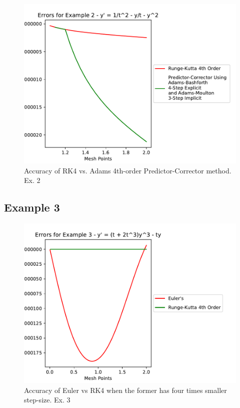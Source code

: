 \documentclass[11pt]{article}	%
\begin{document}
\begin{figure}[H]
\centering
\includegraphics[width=.4\textwidth]{rk4_predictor_2}
\caption{Accuracy of RK4 vs. Adams 4th-order Predictor-Corrector method. Ex. 2}
\label{fig:rk4_predictor_2}
\end{figure}
\clearpage
\newpage
\subsection{Example 3}



\begin{figure}[H]
\centering
\includegraphics[width=.45\textwidth]{euler_rk4_3}
\caption{Accuracy of Euler vs RK4 when the former has four times smaller step-size. Ex. 3}
\label{fig:euler_rk4_3}
\end{figure}
\end{document}
